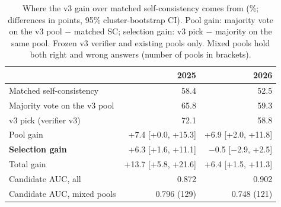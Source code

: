 \begin{table}[!t]
\centering
\scriptsize
\caption{Where the v3 gain over matched self-consistency comes from (\%; differences in points, 95\% cluster-bootstrap CI). Pool gain: majority vote on the v3 pool $-$ matched SC; selection gain: v3 pick $-$ majority on the same pool. Frozen v3 verifier and existing pools only. Mixed pools hold both right and wrong answers (number of pools in brackets).}
\label{tab:v4bdecomp}
\setlength{\tabcolsep}{2.5pt}
\begin{tabular}{lrr}
\toprule
 & 2025 & 2026 \\
\midrule
Matched self-consistency & 58.4 & 52.5 \\
Majority vote on the v3 pool & 65.8 & 59.3 \\
v3 pick (verifier v3) & 72.1 & 58.8 \\
\midrule
Pool gain & +7.4 [+0.0, +15.3] & +6.9 [+2.0, +11.8] \\
\textbf{Selection gain} & +6.3 [+1.6, +11.1] & $-$0.5 [$-$2.9, +2.5] \\
Total gain & +13.7 [+5.8, +21.6] & +6.4 [+1.5, +11.3] \\
\midrule
Candidate AUC, all & 0.872 & 0.902 \\
Candidate AUC, mixed pools & 0.796 (129) & 0.748 (121) \\
\bottomrule
\end{tabular}
\end{table}

